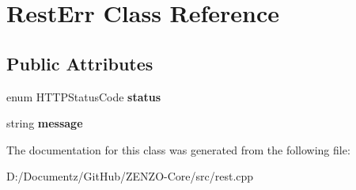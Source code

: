 \hypertarget{class_rest_err}{}\section{Rest\+Err Class Reference}
\label{class_rest_err}
\subsection*{Public Attributes}
\begin{DoxyCompactItemize}
\item 
\mbox{\label{class_rest_err_a4d255c35df09d8909dcc4014bfbe106b}} 
enum H\+T\+T\+P\+Status\+Code {\bfseries status}
\item 
\mbox{\label{class_rest_err_a0235d86cbc21e56c7c635a7fb0d7a52d}} 
string {\bfseries message}
\end{DoxyCompactItemize}


The documentation for this class was generated from the following file\+:\begin{DoxyCompactItemize}
\item 
D\+:/\+Documentz/\+Git\+Hub/\+Z\+E\+N\+Z\+O-\/\+Core/src/rest.\+cpp\end{DoxyCompactItemize}
